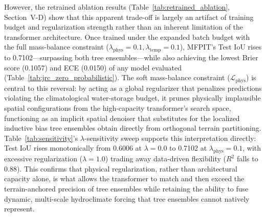 \documentclass[journal]{IEEEtran}
\begin{document}
However, the retrained ablation results (Table~\ref{tab:retrained_ablation}, Section~V-D) show that this apparent trade-off is largely an artifact of training budget and regularization strength rather than an inherent limitation of the transformer architecture. Once trained under the expanded batch budget with the full mass-balance constraint ($\lambda_{\text{phys}} = 0.1, \lambda_{\text{temp}} = 0.1$), MFPIT's Test IoU rises to 0.7102---surpassing both tree ensembles---while also achieving the lowest Brier score (0.1057) and ECE (0.0150) of any model evaluated (Table~\ref{tab:jrc_zero_probabilistic}). The soft mass-balance constraint ($\mathcal{L}_{\text{phys}}$) is central to this reversal: by acting as a global regularizer that penalizes predictions violating the climatological water-storage budget, it prunes physically implausible spatial configurations from the high-capacity transformer's search space, functioning as an implicit spatial denoiser that substitutes for the localized inductive bias tree ensembles obtain directly from orthogonal terrain partitioning. Table~\ref{tab:sensitivity}'s $\lambda$-sensitivity sweep supports this interpretation directly: Test IoU rises monotonically from 0.6006 at $\lambda = 0.0$ to 0.7102 at $\lambda_{\text{phys}} = 0.1$, with excessive regularization ($\lambda = 1.0$) trading away data-driven flexibility ($R^2$ falls to 0.88). This confirms that physical regularization, rather than architectural capacity alone, is what allows the transformer to match and then exceed the terrain-anchored precision of tree ensembles while retaining the ability to fuse dynamic, multi-scale hydroclimate forcing that tree ensembles cannot natively represent.
\end{document}
